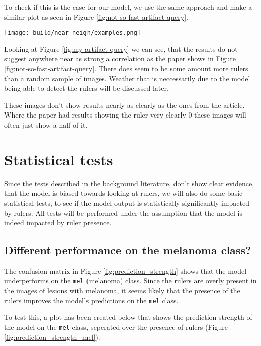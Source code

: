 To check if this is the case for our model, we use the same approach and make a similar plot as seen in Figure \ref{fig:not-so-fast-artifact-query}.

\begin{center}
    \texttt{[image: build/near\_neigh/examples.png]}
    \label{fig:my-artifact-query}
\end{center}

Looking at Figure \ref{fig:my-artifact-query} we can see, that the results do not
suggest anywhere near as strong a correlation as the paper shows in Figure \ref{fig:not-so-fast-artifact-query}.
There does seem to be some amount more rulers than a random sample of images.
Weather that is neccessarily due to the model being able to detect the rulers will be discussed later.

These images don't show results nearly as clearly as the ones from the article.
Where the paper had results showing the ruler very clearly 0 these images will often just show a half of it.

\section{Statistical tests}\label{sec:statistical-tests}
Since the tests described in the background literature, don't show clear evidence,
that the model is biased towards looking at rulers, we will also do some basic statistical tests,
to see if the model output is statistically significantly impacted by rulers.
All tests will be performed under the assumption that the model is indeed impacted by ruler presence.

\subsection{Different performance on the melanoma class?}\label{sec:different-performance-on-the-melanoma-class}
The confusion matrix in Figure \ref{fig:prediction_strength} shows that the model underperforms on the \verb|mel| (melanoma) class.
Since the rulers are overly present in the images of lesions with melanoma,
it seems likely that the presence of the rulers improves the model's predictions
on the \verb|mel| class.

To test this, a plot has been created below that shows the prediction strength of the model on the \verb|mel| class,
seperated over the presence of rulers (Figure \ref{fig:prediction_strength_mel}).

